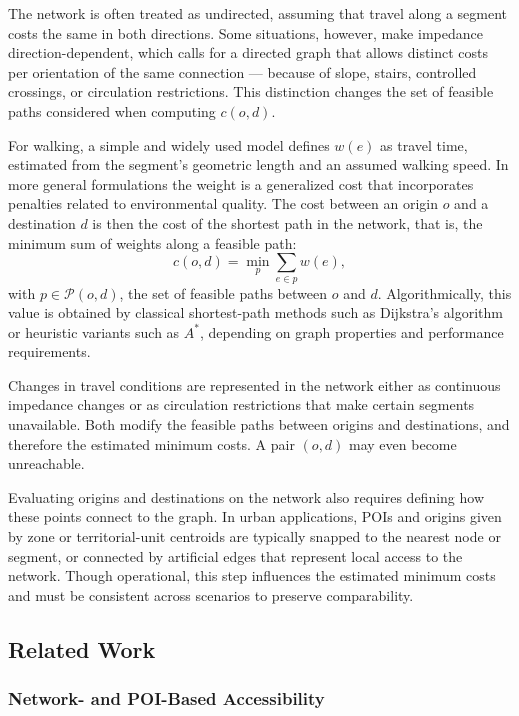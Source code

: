 The network is often treated as undirected, assuming that travel along a segment costs the same in both directions. Some situations, however, make impedance direction-dependent, which calls for a directed graph that allows distinct costs per orientation of the same connection — because of slope, stairs, controlled crossings, or circulation restrictions. This distinction changes the set of feasible paths considered when computing $c(o,d)$.

For walking, a simple and widely used model defines $w(e)$ as travel time, estimated from the segment's geometric length and an assumed walking speed. In more general formulations the weight is a generalized cost that incorporates penalties related to environmental quality. The cost between an origin $o$ and a destination $d$ is then the cost of the shortest path in the network, that is, the minimum sum of weights along a feasible path:
\begin{equation}
    c(o,d) = \min_{p} \sum_{e \in p} w(e),
\end{equation}
with $p \in \mathcal{P}(o,d)$, the set of feasible paths between $o$ and $d$. Algorithmically, this value is obtained by classical shortest-path methods such as Dijkstra's algorithm~\cite{cormen01introduction} or heuristic variants such as $A^*$, depending on graph properties and performance requirements.

Changes in travel conditions are represented in the network either as continuous impedance changes or as circulation restrictions that make certain segments unavailable. Both modify the feasible paths between origins and destinations, and therefore the estimated minimum costs. A pair $(o,d)$ may even become unreachable.

Evaluating origins and destinations on the network also requires defining how these points connect to the graph. In urban applications, POIs and origins given by zone or territorial-unit centroids are typically snapped to the nearest node or segment, or connected by artificial edges that represent local access to the network. Though operational, this step influences the estimated minimum costs and must be consistent across scenarios to preserve comparability.

\subsection{Related Work}

\subsubsection{Network- and POI-Based Accessibility}

